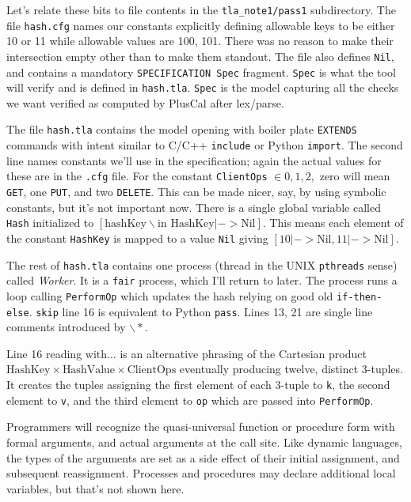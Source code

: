 \documentclass[twocolumn]{article}
\begin{document}
Let's relate these bits to file contents in the \texttt{tla\_note1/pass1} subdirectory. The file \texttt{hash.cfg} names our constants explicitly defining allowable keys to be either 10 or 11 while allowable values are 100, 101. There was no reason to make their intersection empty other than to make them standout. The file also defines \texttt{Nil}, and contains a mandatory \texttt{SPECIFICATION Spec} fragment. \texttt{Spec} is what the tool will verify and is defined in \texttt{hash.tla}. \texttt{Spec} is the model capturing all the checks we want verified as computed by PlusCal after lex/parse.

The file \texttt{hash.tla} contains the model opening with boiler plate \texttt{EXTENDS} commands with intent similar to C/C++ \texttt{include} or Python \texttt{import}. The second line names constants we'll use in the specification; again the actual values for these are in the \texttt{.cfg} file. For the constant \texttt{ClientOps} $\in {0,1,2,}$ zero will mean \texttt{GET}, one \texttt{PUT}, and two \texttt{DELETE}. This can be made nicer, say, by using symbolic constants, but it's not important now. There is a single global variable called \texttt{Hash} initialized to $[\text{hashKey} \backslash \text{in HashKey} |-> \text{Nil}]$. This means each element of the constant \texttt{HashKey} is mapped to a value \texttt{Nil} giving $[10 |-> \text{Nil}, 11 |-> \text{Nil}]$.

The rest of \texttt{hash.tla} contains one process (thread in the UNIX \texttt{pthreads} sense) called \emph{Worker}. It is a \texttt{fair} process, which I'll return to later. The process runs a loop calling \texttt{PerformOp} which updates the hash relying on good old \texttt{if-then-else}. \texttt{skip} line 16 is equivalent to Python \texttt{pass}. Lines 13, 21 are single line comments introduced by ${\backslash*}$.

Line 16 reading $\text{with}\ldots$ is an alternative phrasing of the Cartesian product $\text{HashKey} \times \text{HashValue} \times \text{ClientOps}$ eventually producing twelve, distinct 3-tuples. It creates the tuples assigning the first element of each 3-tuple to \texttt{k}, the second element to \texttt{v}, and the third element to \texttt{op} which are passed into \texttt{PerformOp}.

Programmers will recognize the quasi-universal function or procedure form with formal arguments, and actual arguments at the call site. Like dynamic languages, the types of the arguments are set as a side effect of their initial assignment, and subsequent reassignment. Processes and procedures may declare additional local variables, but that's not shown here. 
\end{document}
